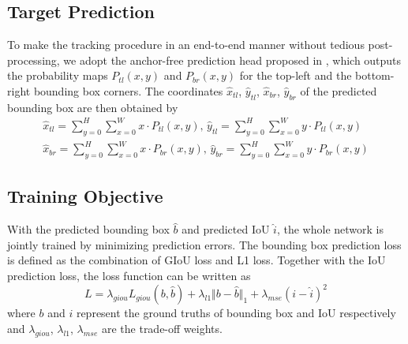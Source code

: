 \subsection{Target Prediction}
To make the tracking procedure in an end-to-end manner without tedious post-processing, we adopt the anchor-free prediction head proposed in \cite{yan2021learning}, which outputs the probability maps $P_{tl}(x,y)$ and $P_{br}(x,y)$ for the top-left and the bottom-right bounding box corners. The coordinates $\widehat{x}_{tl}$, $\widehat{y}_{tl}$, $\widehat{x}_{br}$, $\widehat{y}_{br}$ of the predicted bounding box are then obtained by 
\begin{gather}
    \widehat{x}_{tl} = \sum_{y = 0}^{H}\sum_{x = 0}^{W}x \cdot P_{tl}(x,y) \text{, } \widehat{y}_{tl} = \sum_{y = 0}^{H}\sum_{x = 0}^{W}y \cdot P_{tl}(x,y) \\
    \widehat{x}_{br} = \sum_{y = 0}^{H}\sum_{x = 0}^{W}x \cdot P_{br}(x,y) \text{, } \widehat{y}_{br} = \sum_{y = 0}^{H}\sum_{x = 0}^{W}y \cdot P_{br}(x,y)
\end{gather}

\subsection{Training Objective}
With the predicted bounding box $\widehat{b}$ and predicted IoU $\widehat{i}$, the whole network is jointly trained by minimizing prediction errors. The bounding box prediction loss is defined as the combination of GIoU loss \cite{rezatofighi2019generalized} and L1 loss. Together with the IoU prediction loss, the loss function can be written as 
\begin{equation}
    L = \lambda_{giou}L_{giou}(b, \widehat{b}) + \lambda_{l1}\Vert b - \widehat{b}\Vert_{1} + \lambda_{mse}(i - \widehat{i})^{2}
\end{equation}
where $b$ and $i$ represent the ground truths of bounding box and IoU respectively and $\lambda_{giou}$, $\lambda_{l1}$, $\lambda_{mse}$ are the trade-off weights.

